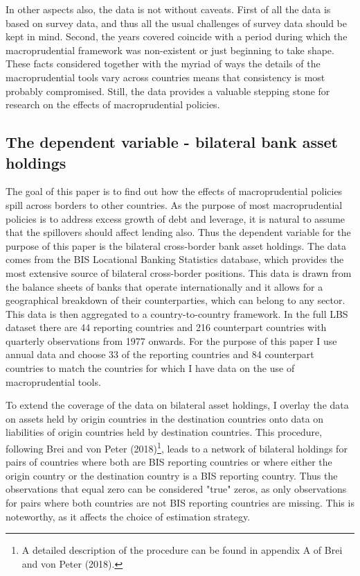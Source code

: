 \documentclass[12pt,a4paper]{article}
\begin{document}
In other aspects also, the data is not without caveats. First of all the data is based on survey data, and thus all the usual challenges of survey data should be kept in mind. Second, the years covered coincide with a period during which the macroprudential framework was non-existent or just beginning to take shape. These facts considered together with the myriad of ways the details of the macroprudential tools vary across countries means that consistency is most probably compromised. Still, the data provides a valuable stepping stone for research on the effects of macroprudential policies. 

\subsection{The dependent variable - bilateral bank asset holdings}

The goal of this paper is to find out how the effects of macroprudential policies spill across borders to other countries. As the purpose of most macroprudential policies is to address excess growth of debt and leverage, it is natural to assume that the spillovers should affect lending also. Thus the dependent variable for the purpose of this paper is the bilateral cross-border bank asset holdings. The data comes from the BIS Locational Banking Statistics database, which provides the most extensive source of bilateral cross-border positions. This data is drawn from the balance sheets of banks that operate internationally and it allows for a geographical breakdown of their counterparties, which can belong to any sector. This data is then aggregated to a country-to-country framework. In the full LBS dataset there are 44 reporting countries and 216 counterpart countries with quarterly observations from 1977 onwards. For the purpose of this paper I use annual data and choose 33 of the reporting countries and 84 counterpart countries to match the countries for which I have data on the use of macroprudential tools. 

To extend the coverage of the data on bilateral asset holdings, I overlay the data on assets held by origin countries in the destination countries onto data on liabilities of origin countries held by destination countries. This procedure, following Brei and von Peter (2018)\footnote{A detailed description of the procedure can be found in appendix A of Brei and von Peter (2018).}, leads to a network of bilateral holdings for pairs of countries where both are BIS reporting countries or where either the origin country or the destination country is a BIS reporting country. Thus the observations that equal zero can be considered "true" zeros, as only observations for pairs where both countries are not BIS reporting countries are missing. This is noteworthy, as it affects the choice of estimation strategy.
\end{document}
